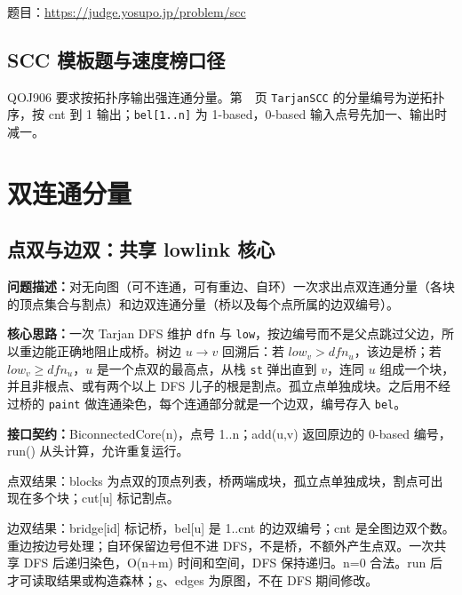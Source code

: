 题目：\url{https://judge.yosupo.jp/problem/scc}



\subsection{SCC 模板题与速度榜口径}\label{knowledge-scc-template}
QOJ906 要求按拓扑序输出强连通分量。第~\pageref{compact-TarjanSCC}~页 \texttt{TarjanSCC} 的分量编号为逆拓扑序，按 cnt 到 1 输出；\texttt{bel[1..n]} 为 1-based，0-based 输入点号先加一、输出时减一。



\Needspace{538pt}

\section{双连通分量}

\subsection{点双与边双：共享 lowlink 核心}\label{compact-BiconnectedCore}

\noindent\textbf{问题描述：}\allowbreak 对无向图（可不连通，可有重边、自环）一次求出点双连通分量（各块的顶点集合与割点）和边双连通分量（桥以及每个点所属的边双编号）。

\textbf{核心思路：}\allowbreak 一次 Tarjan DFS 维护 \texttt{dfn} 与 \texttt{low}，按边编号而不是父点跳过父边，所以重边能正确地阻止成桥。树边 $u\to v$ 回溯后：若 $low_v>dfn_u$，该边是桥；若 $low_v\ge dfn_u$，$u$ 是一个点双的最高点，从栈 \texttt{st} 弹出直到 $v$，连同 $u$ 组成一个块，并且非根点、或有两个以上 DFS 儿子的根是割点。孤立点单独成块。之后用不经过桥的 \texttt{paint} 做连通染色，每个连通部分就是一个边双，编号存入 \texttt{bel}。



{\sloppy{}\noindent\textbf{接口契约：}BiconnectedCore(n)，点号 1..n；add(u,v) 返回原边的 0-based 编号，run() 从头计算，允许重复运行。

点双结果：blocks 为点双的顶点列表，桥两端成块，孤立点单独成块，割点可出现在多个块；cut[u] 标记割点。

边双结果：bridge[id] 标记桥，bel[u] 是 1..cnt 的边双编号；cnt 是全图边双个数。重边按边号处理；自环保留边号但不进 DFS，不是桥，不额外产生点双。一次共享 DFS 后递归染色，O(n+m) 时间和空间，DFS 保持递归。n=0 合法。run 后才可读取结果或构造森林；g、edges 为原图，不在 DFS 期间修改。\par}

